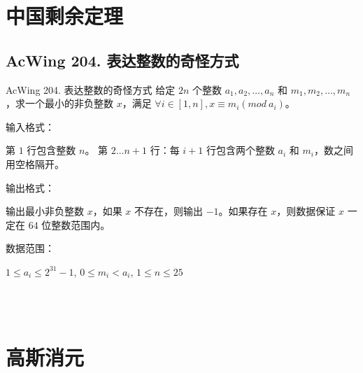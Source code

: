 \section{中国剩余定理}

\subsection{AcWing 204. 表达整数的奇怪方式}
\begin{titledbox}{AcWing 204. 表达整数的奇怪方式}
    给定 $2n$ 个整数 $a_1,a_2,\dots,a_n$ 和 $m_1,m_2,\dots ,m_n$，求一个最小的非负整数 $x$，满足 $ \forall i \in [1,n],x \equiv m_i(mod\ a_i)$。

    输入格式：

    第 $1$ 行包含整数 $n$。 第 $2 \dots n+1$ 行：每 $i+1$ 行包含两个整数 $a_i$ 和 $m_i$，数之间用空格隔开。

    输出格式：

    输出最小非负整数 $x$，如果 $x$ 不存在，则输出 $-1$。如果存在 $x$，则数据保证 $x$ 一定在 $64$ 位整数范围内。

    数据范围：

    $1 \le a_i \le 2^{31}-1$, $0 \le m_i < a_i$, $1 \le n \le 25$

    \begin{inputblock}
         \\
         \\
    \end{inputblock}
    \begin{outputblock}
    \end{outputblock}
\end{titledbox}


\section{高斯消元}

